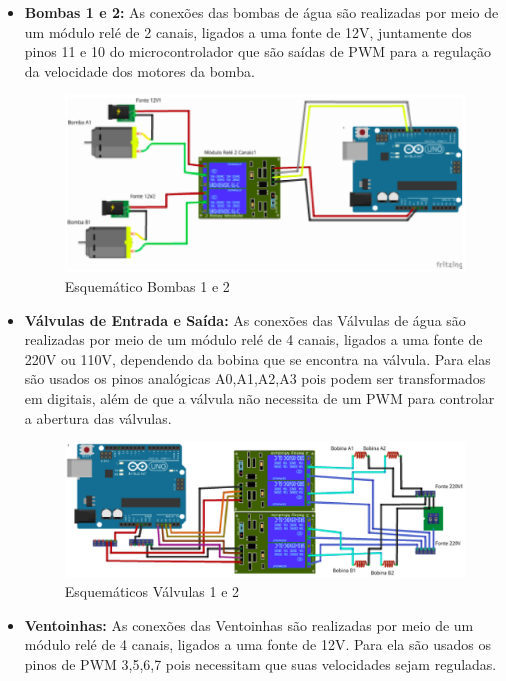 \begin{itemize}
    \item \textbf{Bombas 1 e 2:} As conexões das bombas de água são realizadas por meio de um módulo relé de 2 canais, ligados a uma fonte de 12V, juntamente dos pinos 11 e 10 do microcontrolador que são saídas de PWM para a regulação da velocidade dos motores da bomba.
    \begin{figure}[hb]                  
        \centering                          
        \includegraphics[scale=0.7]{figuras/bomb12.eps}
        \caption{ Esquemático Bombas 1 e 2 }   \label{figbomb12}              
    \end{figure}      

    \item \textbf{Válvulas de Entrada e Saída:} As conexões das Válvulas de água são realizadas por meio de um módulo relé de 4 canais, ligados a uma fonte de 220V ou 110V, dependendo da bobina que se encontra na válvula.
    Para elas são usados os pinos analógicas A0,A1,A2,A3 pois podem ser transformados em digitais, além de que a válvula não necessita de um PWM para controlar a abertura das válvulas.
    
    \begin{figure}[hb]                  
        \centering                          
        \includegraphics[scale=0.7]{figuras/valv1.eps}
        \caption{ Esquemáticos Válvulas 1 e 2 }   \label{figvalv12}              
    \end{figure} 
    \newpage
    \item \textbf{Ventoinhas:} As conexões das Ventoinhas são realizadas por meio de um módulo relé de 4 canais, ligados a uma fonte de 12V. Para ela são usados os pinos de PWM 3,5,6,7 pois necessitam que suas velocidades sejam reguladas.


\end{itemize}
